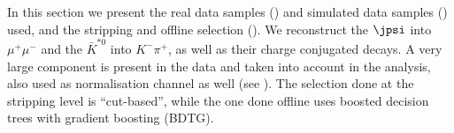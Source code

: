 

In this section we present the real data samples () and simulated data samples ()
used, and the stripping and offline selection (). We reconstruct the $\jpsi$ into $\mu^+\mu^-$ and the $\bar{K}^{*0}$ into $K^-\pi^+$, as well as their charge conjugated decays. A very large \BdJKst component is 
present in the data and taken into account in the analysis, also used as normalisation channel as well 
(see ). The selection done at the stripping level is ``cut-based'', while the one done 
offline uses boosted decision trees with gradient boosting (BDTG). 
